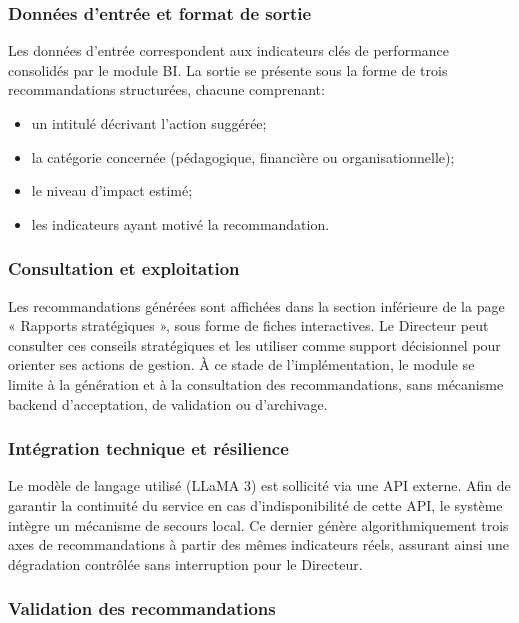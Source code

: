 \subsubsection{Données d'entrée et format de sortie}

Les données d'entrée correspondent aux indicateurs clés de performance consolidés par le module BI. La sortie se présente sous la forme de trois recommandations structurées, chacune comprenant:
\begin{itemize}[label=$\bullet$,leftmargin=*]
    \item un intitulé décrivant l'action suggérée;
    \item la catégorie concernée (pédagogique, financière ou organisationnelle);
    \item le niveau d'impact estimé;
    \item les indicateurs ayant motivé la recommandation.
\end{itemize}

\subsubsection{Consultation et exploitation}

Les recommandations générées sont affichées dans la section inférieure de la page « Rapports stratégiques », sous forme de fiches interactives. Le Directeur peut consulter ces conseils stratégiques et les utiliser comme support décisionnel pour orienter ses actions de gestion. À ce stade de l'implémentation, le module se limite à la génération et à la consultation des recommandations, sans mécanisme backend d'acceptation, de validation ou d'archivage.

\subsubsection{Intégration technique et résilience}

Le modèle de langage utilisé (LLaMA 3) est sollicité via une API externe. Afin de garantir la continuité du service en cas d'indisponibilité de cette API, le système intègre un mécanisme de secours local. Ce dernier génère algorithmiquement trois axes de recommandations à partir des mêmes indicateurs réels, assurant ainsi une dégradation contrôlée sans interruption pour le Directeur.
\subsubsection{Validation des recommandations}

